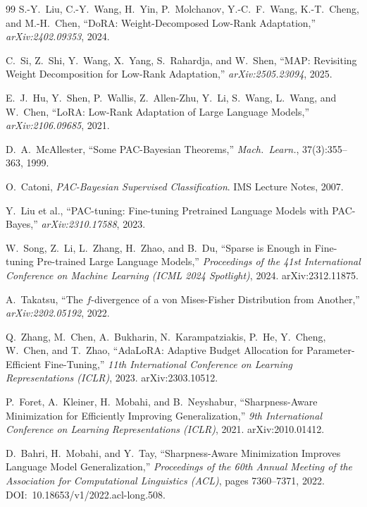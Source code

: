 \documentclass[11pt]{article}
\begin{document}
\begin{thebibliography}{99}
S.-Y.\ Liu, C.-Y.\ Wang, H.\ Yin, P.\ Molchanov, Y.-C.\ F.\ Wang,
K.-T.\ Cheng, and M.-H.\ Chen,
``DoRA: Weight-Decomposed Low-Rank Adaptation,''
\textit{arXiv:2402.09353}, 2024.

C.\ Si, Z.\ Shi, Y.\ Wang, X.\ Yang, S.\ Rahardja, and W.\ Shen,
``MAP: Revisiting Weight Decomposition for Low-Rank Adaptation,''
\textit{arXiv:2505.23094}, 2025.

E.\ J.\ Hu, Y.\ Shen, P.\ Wallis, Z.\ Allen-Zhu, Y.\ Li, S.\ Wang,
L.\ Wang, and W.\ Chen,
``LoRA: Low-Rank Adaptation of Large Language Models,''
\textit{arXiv:2106.09685}, 2021.

D.\ A.\ McAllester,
``Some PAC-Bayesian Theorems,''
\textit{Mach.\ Learn.}, 37(3):355--363, 1999.

O.\ Catoni,
\textit{PAC-Bayesian Supervised Classification}.
IMS Lecture Notes, 2007.

Y.\ Liu et al.,
``PAC-tuning: Fine-tuning Pretrained Language Models with PAC-Bayes,''
\textit{arXiv:2310.17588}, 2023.

W.\ Song, Z.\ Li, L.\ Zhang, H.\ Zhao, and B.\ Du,
``Sparse is Enough in Fine-tuning Pre-trained Large Language Models,''
\textit{Proceedings of the 41st International Conference on Machine Learning
  (ICML 2024 Spotlight)}, 2024.
arXiv:2312.11875.

A.\ Takatsu,
``The $f$-divergence of a von Mises-Fisher Distribution from Another,''
\textit{arXiv:2202.05192}, 2022.

Q.\ Zhang, M.\ Chen, A.\ Bukharin, N.\ Karampatziakis, P.\ He,
Y.\ Cheng, W.\ Chen, and T.\ Zhao,
``AdaLoRA: Adaptive Budget Allocation for Parameter-Efficient Fine-Tuning,''
\textit{11th International Conference on Learning Representations (ICLR)},
2023. arXiv:2303.10512.

P.\ Foret, A.\ Kleiner, H.\ Mobahi, and B.\ Neyshabur,
``Sharpness-Aware Minimization for Efficiently Improving Generalization,''
\textit{9th International Conference on Learning Representations (ICLR)},
2021. arXiv:2010.01412.

D.\ Bahri, H.\ Mobahi, and Y.\ Tay,
``Sharpness-Aware Minimization Improves Language Model Generalization,''
\textit{Proceedings of the 60th Annual Meeting of the Association for
  Computational Linguistics (ACL)}, pages 7360--7371, 2022.
DOI:~10.18653/v1/2022.acl-long.508.


\end{thebibliography}
\end{document}
